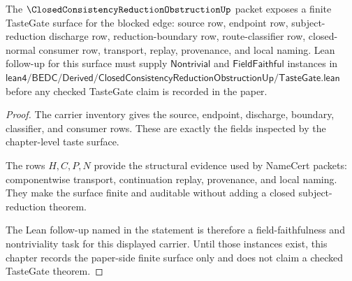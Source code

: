 \begin{theorem}
\label{thm:closed-consistency-reduction-obstruction-tastegate-surface}
The $\ClosedConsistencyReductionObstructionUp$ packet exposes a finite TasteGate surface for the blocked edge: source row, endpoint row, subject-reduction discharge row, reduction-boundary row, route-classifier row, closed-normal consumer row, transport, replay, provenance, and local naming. Lean follow-up for this surface must supply $\mathsf{Nontrivial}$ and $\mathsf{FieldFaithful}$ instances in $\mathsf{lean4/BEDC/Derived/ClosedConsistencyReductionObstructionUp/TasteGate.lean}$ before any checked TasteGate claim is recorded in the paper.
\end{theorem}
\begin{proof}
The carrier inventory gives the source, endpoint, discharge, boundary, classifier, and consumer rows. These are exactly the fields inspected by the chapter-level taste surface.

The rows $H,C,P,N$ provide the structural evidence used by NameCert packets: componentwise transport, continuation replay, provenance, and local naming. They make the surface finite and auditable without adding a closed subject-reduction theorem.

The Lean follow-up named in the statement is therefore a field-faithfulness and nontriviality task for this displayed carrier. Until those instances exist, this chapter records the paper-side finite surface only and does not claim a checked TasteGate theorem.
\end{proof}




